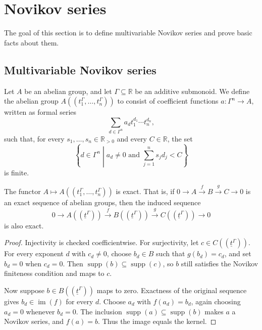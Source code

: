 
\section{Novikov series}
\label{sec:novikov_series}

The goal of this section is to define multivariable Novikov series and prove
basic facts about them.

\subsection{Multivariable Novikov series}

\begin{definition}
  \label{def:novikov_series}
  \leanok
  Let $A$ be an abelian group, and let $\Gamma \subseteq \mathbb{R}$ be an
  additive submonoid. We define the abelian group $A((t_1^\Gamma, \dotsc,
  t_n^\Gamma))$ to consist of coefficient functions $a\colon\Gamma^n\to A$,
  written as formal series
  \[
    \sum_{d\in\Gamma^n} a_d t_1^{d_1}\dotsm t_n^{d_n},
  \]
  such that, for every $s_1,\dotsc,s_n\in\mathbb{R}_{>0}$ and every
  $C\in\mathbb{R}$, the set
  \[
    \left\{d\in\Gamma^n \mathrel{}\middle|
      a_d\ne 0 \text{ and } \sum_{j=1}^n s_jd_j<C\right\}
  \]
  is finite.
\end{definition}

\begin{lemma}
  \label{lem:novikov_exact}
  \leanok
  The functor $A \mapsto A((t_1^\Gamma, \dotsc, t_n^\Gamma))$ is exact. That is,
  if $0 \to A \xrightarrow{f} B \xrightarrow{g} C \to 0$ is an exact sequence of
  abelian groups, then the induced sequence
  \[ 0 \to A((\underline{t}^\Gamma)) \xrightarrow{f} B((\underline{t}^\Gamma))
  \xrightarrow{g} C((\underline{t}^\Gamma)) \to 0 \]
  is also exact.
\end{lemma}

\begin{proof}
  \leanok
  Injectivity is checked coefficientwise.  For surjectivity, let
  $c\in C((\underline{t}^\Gamma))$.  For every exponent $d$ with $c_d\ne0$,
  choose $b_d\in B$ such that $g(b_d)=c_d$, and set $b_d=0$ when $c_d=0$.
  Then $\operatorname{supp}(b)\subseteq\operatorname{supp}(c)$, so $b$ still
  satisfies the Novikov finiteness condition and maps to $c$.

  Now suppose $b\in B((\underline{t}^\Gamma))$ maps to zero.  Exactness of the
  original sequence gives $b_d\in\operatorname{im}(f)$ for every $d$.  Choose
  $a_d$ with $f(a_d)=b_d$, again choosing $a_d=0$ whenever $b_d=0$.  The
  inclusion $\operatorname{supp}(a)\subseteq\operatorname{supp}(b)$ makes $a$
  a Novikov series, and $f(a)=b$.  Thus the image equals the kernel.
\end{proof}

